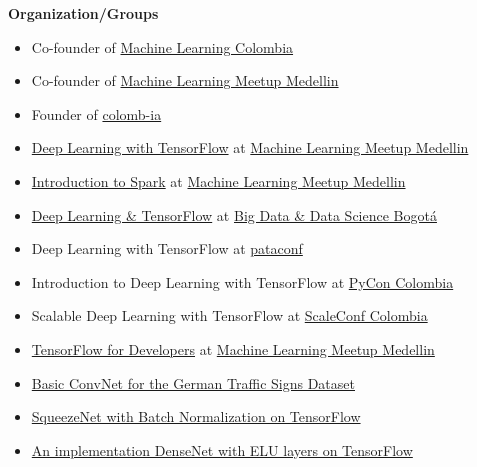 
\textbf{Organization/Groups}
\begin{itemize}
\tightlist
\item
  Co-founder of
  \href{https://www.facebook.com/groups/1766056600304468}{Machine
  Learning Colombia}
\item
  Co-founder of \href{https://www.meetup.com/es-ES/ml-medellin}{Machine
  Learning Meetup Medellin}
\item
  Founder of
  \href{https://github.com/colomb-ia/mision-vision}{colomb-ia}
\end{itemize}

\begin{itemize}
\tightlist
\item
  \href{https://www.meetup.com/es-ES/ml-medellin/events/231887878/}{Deep
  Learning with TensorFlow} at
  \href{https://www.meetup.com/es-ES/ml-medellin}{Machine Learning
  Meetup Medellin}
\item
  \href{https://www.meetup.com/es-ES/ml-medellin/events/232587669/}{Introduction
  to Spark} at \href{https://www.meetup.com/es-ES/ml-medellin}{Machine
  Learning Meetup Medellin}
\item
  \href{https://www.meetup.com/es-ES/Big-Data-Science-Bogota/events/233975872}{Deep
  Learning \& TensorFlow} at
  \href{https://www.meetup.com/es-ES/Big-Data-Science-Bogota/}{Big Data
  \& Data Science Bogotá}
\item
  Deep Learning with TensorFlow at \href{http://pataconf.com/}{pataconf}
\item
  Introduction to Deep Learning with TensorFlow at
  \href{http://www.pycon.co/}{PyCon Colombia}
\item
  Scalable Deep Learning with TensorFlow at
  \href{http://scaleconfco.com/}{ScaleConf Colombia}
\item
  \href{https://www.meetup.com/es-ES/ml-medellin/events/238072044/}{TensorFlow
  for Developers} at
  \href{https://www.meetup.com/es-ES/ml-medellin}{Machine Learning
  Meetup Medellin}
\end{itemize}


\begin{itemize}
\tightlist
\item
  \href{https://github.com/cgarciae/supervised-avanzado-german-traffic-signs/tree/feature/solucion-basica}{Basic
  ConvNet for the German Traffic Signs Dataset}
\item
  \href{https://github.com/cgarciae/supervised-avanzado-german-traffic-signs/tree/feature/batch-norm-squeeze-net}{SqueezeNet
  with Batch Normalization on TensorFlow}
\item
  \href{https://github.com/cgarciae/supervised-avanzado-german-traffic-signs/tree/feature/dense-net-elu-2}{An
  implementation DenseNet with ELU layers on TensorFlow}
\end{itemize}